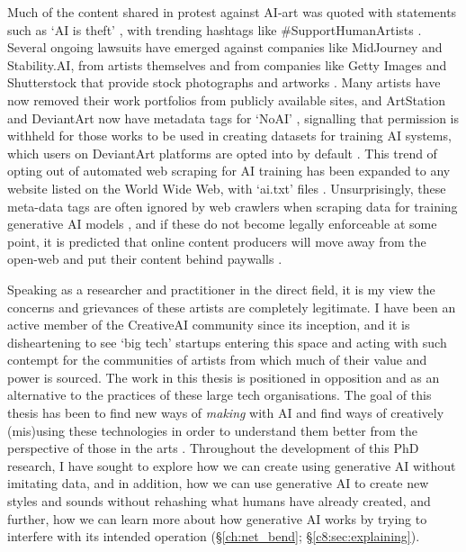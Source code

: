 Much of the content shared in protest against AI-art was quoted with statements such as `AI is theft' \citep{whiddington2022backlash}, with trending hashtags like \#SupportHumanArtists \citep{zakuga2022theft}. 
Several ongoing lawsuits have emerged against companies like MidJourney and Stability.AI, from artists themselves \citep{brittain2023artists} and from companies like Getty Images and Shutterstock that provide stock photographs and artworks \citep{vincent2023getty}. 
Many artists have now removed their work portfolios from publicly available sites, and ArtStation and DeviantArt now have metadata tags for ‘NoAI’ \citep{artstation2022noai}, signalling that permission is withheld for those works to be used in creating datasets for training AI systems, which users on DeviantArt platforms are opted into by default \citep{deviantart2022optout}. 
This trend of opting out of automated web scraping for AI training has been expanded to any website listed on the World Wide Web, with `ai.txt' files \citep{aitxt2024spawning}.
Unsurprisingly, these meta-data tags are often ignored by web crawlers when scraping data for training generative AI models \citep{weatherbed2024anthropic}, and if these do not become legally enforceable at some point, it is predicted that online content producers will move away from the open-web and put their content behind paywalls \citep{longpre2024consent}.

Speaking as a researcher and practitioner in the direct field, it is my view the concerns and grievances of these artists are completely legitimate. 
I have been an active member of the CreativeAI community since its inception, and it is disheartening to see `big tech' startups entering this space and acting with such contempt for the communities of artists from which much of their value and power is sourced. 
The work in this thesis is positioned in opposition and as an alternative to the practices of these large tech organisations. 
The goal of this thesis has been to find new ways of \textit{making} with AI and find ways of creatively (mis)using these technologies in order to understand them better from the perspective of those in the arts \citep{salvaggio2023aarg}.
Throughout the development of this PhD research, I have sought to explore how we can create using generative AI without imitating data, and in addition, how we can use generative AI to create new styles and sounds without rehashing what humans have already created, and further, how we can learn more about how generative AI works by trying to interfere with its intended operation (\S \ref{ch:net_bend}; \S \ref{c8:sec:explaining}).

